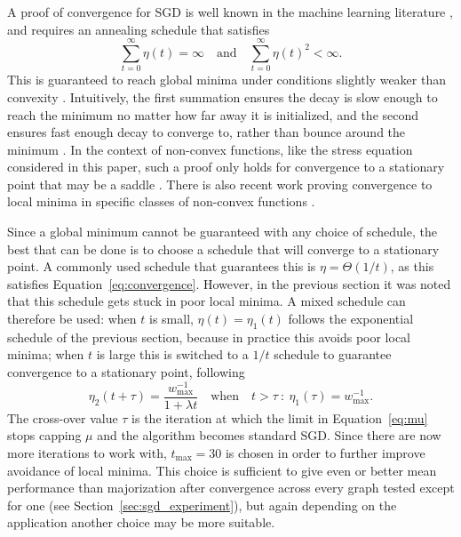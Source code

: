 A proof of convergence for SGD is well known in the machine learning literature \citep{Bottou2012}, and requires an annealing schedule that satisfies
\begin{equation}
  \sum_{t=0}^{\infty}\eta(t) = \infty
  \quad \text{and} \quad
  \sum_{t=0}^{\infty}\eta(t)^2 < \infty.
  \label{eq:convergence}
\end{equation}
This is guaranteed to reach global minima under conditions slightly weaker than convexity \citep{Bottou1998}.
Intuitively, the first summation ensures the decay is slow enough to reach the minimum no matter how far away it is initialized, and the second ensures fast enough decay to converge to, rather than bounce around the minimum \citep{Welling2011}.
In the context of non-convex functions, like the stress equation considered in this paper, such a proof only holds for convergence to a stationary point that may be a saddle \citep{Bottou1998}.
There is also recent work proving convergence to local minima in specific classes of non-convex functions \citep{Ge2015}.

Since a global minimum cannot be guaranteed with any choice of schedule, the best that can be done is to choose a schedule that will converge to a stationary point. A commonly used schedule that guarantees this is $\eta=\Theta(1/t)$, as this satisfies Equation~\eqref{eq:convergence}. However, in the previous section it was noted that this schedule gets stuck in poor local minima. A mixed schedule can therefore be used: when $t$ is small, $\eta(t)=\eta_1(t)$ follows the exponential schedule of the previous section, because in practice this avoids poor local minima; when $t$ is large this is switched to a $1/t$ schedule to guarantee convergence to a stationary point, following
\begin{equation}
  \eta_{2}(t + \tau) =
  \frac{w_{\max}^{-1}}{1+\lambda t}
  \quad \text{when}
  \quad t>\tau\: :\:
  \eta_{1}(\tau) = w_{\max}^{-1}.
\end{equation}
The cross-over value $\tau$ is the iteration at which the limit in Equation~\eqref{eq:mu} stops capping $\mu$ and the algorithm becomes standard SGD.
Since there are now more iterations to work with, $t_{\max}=30$ is chosen in order to further improve avoidance of local minima. This choice is sufficient to give even or better mean performance than majorization after convergence across every graph tested except for one (see Section~\ref{sec:sgd_experiment}), but again depending on the application another choice may be more suitable.

